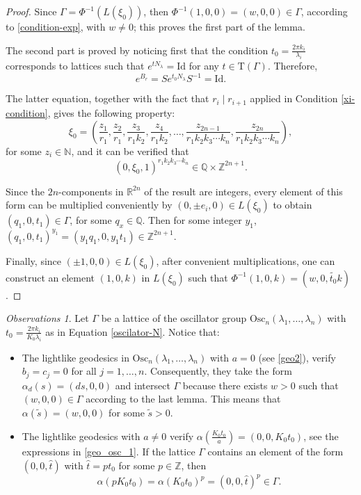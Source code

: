 \documentclass[12pt]{amsart}
\theoremstyle{plain}
\theoremstyle{definition}
\theoremstyle{remark}
\newtheorem{obs}[thm]{Observations}
\begin{document}
\begin{proof}

    Since \( \Gamma = \Phi^{-1}(L(\xi_0)) \), then \( \Phi^{-1}(1,0,0) = (w,0,0) \in \Gamma \), according to \eqref{condition-exp}, with \( w \neq 0 \); this proves the first part of the lemma.
    
    The second part is proved by noticing first that the condition \( t_0 = \frac{2 \pi k_i}{\lambda_i} \) corresponds to lattices such that \( e^{tN_\lambda} = \text{Id} \) for any \( t \in \mathrm{T}(\Gamma) \). Therefore,
    \[
    e^{B_r} = S e^{t_0 N_\lambda} S^{-1} = \text{Id}.
    \]
    
    The latter equation, together with the fact that \( r_i \mid r_{i+1} \) applied in Condition \eqref{xi-condition}, gives the following property:
    \[
    \xi_0 = \left(\frac{z_1}{r_1}, \frac{z_2}{r_1}, \frac{z_3}{r_1 k_2}, \frac{z_4}{r_1 k_2}, \ldots, \frac{z_{2n-1}}{r_1 k_2 k_3 \cdots k_n}, \frac{z_{2n}}{r_1 k_2 k_3 \cdots k_n} \right),
    \]
    for some \( z_i \in \mathbb{N} \), and it can be verified that
    \[
    (0, \xi_0, 1)^{r_1 k_2 k_3 \cdots k_n} \in \mathbb{Q} \times \mathbb{Z}^{2n+1}.
    \]
    
    Since the \( 2n \)-components in \( \mathbb{R}^{2n} \) of the result are integers, every element of this form can be multiplied conveniently by \( (0, \pm e_i, 0) \in L(\xi_0) \) to obtain \( (q_1, 0, t_1) \in \Gamma \), for some \( q_x \in \mathbb{Q} \). Then for some integer \( y_1 \), \( (q_1, 0, t_1)^{y_1} = (y_1 q_1, 0, y_1 t_1) \in \mathbb{Z}^{2n+1} \).
    
    Finally, since \( (\pm 1, 0, 0) \in L(\xi_0) \), after convenient multiplications, one can construct an element \( (1, 0, k) \) in \( L(\xi_0) \) such that \( \Phi^{-1}(1, 0, k) = (w, 0, \widetilde{t_0} k) \).
\end{proof}

\begin{obs}\label{obs-osc}
    Let \( \Gamma \) be a lattice of the oscillator group \( \text{Osc}_n(\lambda_1, \ldots, \lambda_n) \) with \( t_0 = \frac{2\pi k_i}{K_0 \lambda_i} \) as in Equation \eqref{oscilator-N}. Notice that:
    \begin{itemize}
        \item The lightlike geodesics in \( \text{Osc}_n(\lambda_1, \ldots, \lambda_n) \) with \( a = 0 \) (see \eqref{geo2}), verify \( b_j = c_j = 0 \) for all \( j = 1, \ldots, n \). Consequently, they take the form \( \alpha_d(s) = (ds, 0, 0) \) and intersect \( \Gamma \) because there exists \( w > 0 \) such that \( (w, 0, 0) \in \Gamma \) according to the last lemma. This means that \( \alpha(\tilde{s}) = (w, 0, 0) \) for some \( \tilde{s} > 0 \).
        \item The lightlike geodesics with \( a \neq 0 \) verify \( \alpha\left(\frac{K_0 t_0}{a}\right) = (0, 0, K_0 t_0) \), see the expressions in \eqref{geo_osc_1}. If the lattice \( \Gamma \) contains an element of the form \( (0, 0, \hat{t}) \) with \( \hat{t} = p t_0 \) for some \( p \in \mathbb{Z} \), then
        \[
        \alpha(p K_0 t_0) = \alpha(K_0 t_0)^p = (0, 0, \hat{t})^p \in \Gamma.
        \]
    \end{itemize}
\end{obs}    
\end{document}
